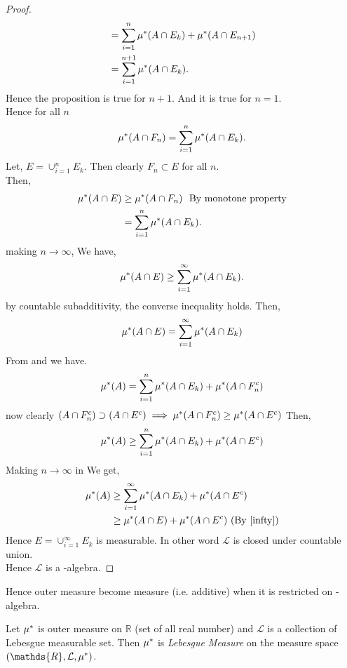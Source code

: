 \begin{proof}
\begin{align*}
                           &=\sum_{i=1}^{n}\mu^{*}(A\cap E_k)+\mu^{*}(A\cap E_{n+1})\\
                           &=\sum_{i=1}^{n+1}\mu^{*}(A\cap E_k).
    \end{align*}
    Hence the proposition is true for $n+1$. And it is true for  $n=1$.\\
    Hence for all $n$
    \begin{equation}
        \label{FnEn}
        \mu^{*}(A\cap F_n)=\sum_{i=1}^{n}\mu^{*}(A\cap E_k).
    \end{equation}
    Let, $E=\cup_{i=1}^{n}E_k$. Then clearly $F_n\subset E$ for all $n$.\\
    Then, 
    \begin{align*}
        \mu^{*}(A\cap E)&\ge \mu^{*}(A\cap F_n) \ \text{ By monotone property}\\
                     &=\sum_{i=1}^{n}\mu^{*}(A\cap E_k).
    \end{align*}
    making  $n\to\infty$, We have,
    \begin{align*}
        \mu^{*}(A\cap E)\ge \sum_{i=1}^{\infty}\mu^{*}(A\cap E_k).
    \end{align*}
    by countable subadditivity, the converse inequality holds. Then,
    \begin{equation}
        \label{infty}
        \mu^{*}(A\cap E)=\sum_{i=1}^{\infty}\mu^{*}(A\cap E_k)
    \end{equation}
    From  and  we have.
    \begin{equation}
        \mu^{*}(A)=\sum_{i=1}^{n}\mu^{*}(A\cap E_k)+\mu^{*}(A\cap F_n^{c})
    \end{equation}
    now clearly $(A\cap F_n^{c})\supset (A\cap E^{c})\implies\mu^{*}(A\cap F_n^{c})\ge \mu^{*}(A\cap E^{c})$
    Then,
    \begin{equation}
        \label{EnE}
        \mu^{*}(A)\ge \sum_{i=1}^{n}\mu^{*}(A\cap E_k)+\mu^{*}(A\cap E^{c})
    \end{equation}
    Making $n\to\infty$ in  We get,
    \begin{align*}
        \smu(A)&\ge \sum_{i=1}^{\infty}\smu(A\cap E_k)+\smu(A\cap E^{c})\\
               &\ge \smu(A\cap E)+\smu(A\cap E^{c}) \ (\text{By \refeq{infty}})
    \end{align*}
    Hence $E=\cup_{i=1}^{\infty}E_k$ is measurable. In other word $\mathcal{L}$ is closed under countable union.\\
    Hence $\mathcal{L}$ is a \sig-algebra.
\end{proof}
Hence outer measure become measure (i.e. additive) when it is restricted on \sig-algebra.
\begin{definition}
    Let $\mu^{*}$ is outer measure on  $\mathds{R}$ (set of all real number) and $\mathcal{L}$ is a collection of Lebesgue measurable set.
    Then $\mu^{*}$ is \textit{Lebesgue Measure} on the measure space $(\mathds{R},\mathcal{L},\smu)$.
\end{definition}

